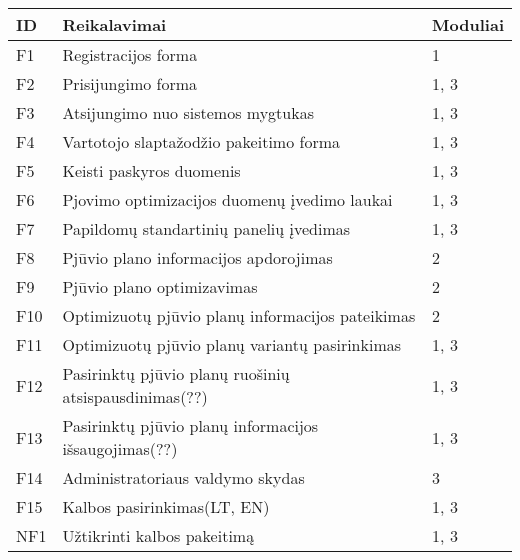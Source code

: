 \documentclass[a4paper,12pt]{article}
\begin{document}
\begin{frame}
\centering

\label{my-label}
\begin{tabular}{|l|l|l|}
\hline
\textbf{ID}	& \textbf{Reikalavimai}						& \textbf{Moduliai}  \\ \hline

F1	& Registracijos forma								& 1	     		\\ \hline

F2	& Prisijungimo forma								& 1, 3			\\ \hline

F3	& Atsijungimo nuo sistemos mygtukas					& 1, 3			\\ \hline

F4	& Vartotojo slaptažodžio pakeitimo forma			& 1, 3			\\ \hline

F5	& Keisti paskyros duomenis	 	  					& 1, 3			\\ \hline 

F6	& Pjovimo optimizacijos duomenų įvedimo laukai		& 1, 3			\\ \hline

F7  & Papildomų standartinių panelių įvedimas 			& 1, 3			\\ \hline

F8	& Pjūvio plano informacijos apdorojimas				& 2				\\ \hline

F9	& Pjūvio plano optimizavimas           	   			& 2				\\ \hline

F10	& Optimizuotų pjūvio planų informacijos pateikimas	& 2     			\\ \hline

F11	& Optimizuotų pjūvio planų variantų pasirinkimas		& 1, 3			\\ \hline

F12	& Pasirinktų pjūvio planų ruošinių atsispausdinimas(??)	& 1, 3			\\ \hline

F13	& Pasirinktų pjūvio planų informacijos išsaugojimas(??)	& 1, 3			\\ \hline

F14	& Administratoriaus valdymo skydas	 	  			& 3				\\ \hline

F15	& Kalbos pasirinkimas(LT, EN)						& 1, 3			\\ \hline

NF1 & Užtikrinti kalbos pakeitimą						& 1, 3			\\ \hline


\end{tabular}
\end{frame}
\end{document}
